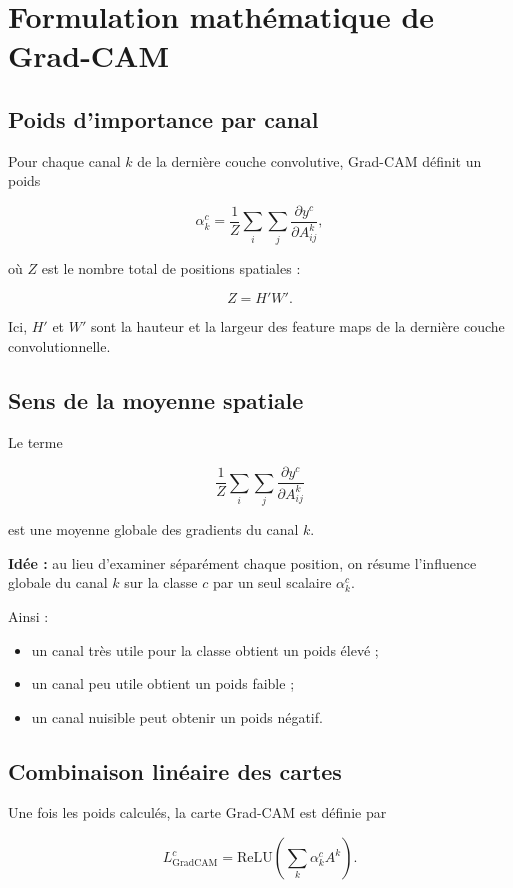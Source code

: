 ﻿\documentclass[11pt,a4paper]{article}
\begin{document}
\section{Formulation mathématique de Grad-CAM}

\subsection{Poids d'importance par canal}

Pour chaque canal $k$ de la dernière couche convolutive, Grad-CAM définit un poids

\[
\alpha_k^c = \frac{1}{Z}\sum_i\sum_j \frac{\partial y^c}{\partial A_{ij}^k},
\]

où $Z$ est le nombre total de positions spatiales :

\[
Z = H'W'.
\]

Ici, $H'$ et $W'$ sont la hauteur et la largeur des feature maps de la dernière couche convolutionnelle.

\subsection{Sens de la moyenne spatiale}

Le terme

\[
\frac{1}{Z}\sum_i\sum_j \frac{\partial y^c}{\partial A_{ij}^k}
\]

est une moyenne globale des gradients du canal $k$.

\textbf{Idée :}
au lieu d'examiner séparément chaque position, on résume l'influence globale du canal $k$ sur la classe $c$ par un seul scalaire $\alpha_k^c$.

Ainsi :
\begin{itemize}
    \item un canal très utile pour la classe obtient un poids élevé ;
    \item un canal peu utile obtient un poids faible ;
    \item un canal nuisible peut obtenir un poids négatif.
\end{itemize}

\subsection{Combinaison linéaire des cartes}

Une fois les poids calculés, la carte Grad-CAM est définie par

\[
L_{\mathrm{GradCAM}}^c = \mathrm{ReLU}\left(\sum_k \alpha_k^c A^k\right).
\]
\end{document}
